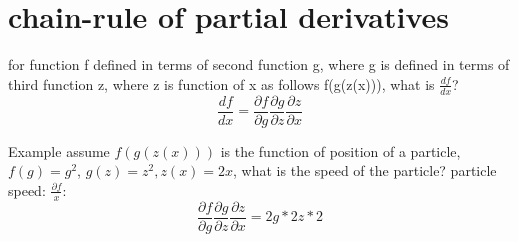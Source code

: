 \documentclass[4apaper,12pt]{book}
\begin{document}
  \section{chain-rule of partial derivatives}
  \begin{description}
  \item for function f defined in terms of second function g, where g is defined in terms of third function z, where z is function of x as follows f(g(z(x))), what is $\frac{df}{dx}$?
    \begin{equation} \frac{df}{dx} = \frac{\partial{f}}{\partial{g}}\frac{\partial{g}}{\partial{z}}\frac{\partial{z}}{\partial{x}} \end{equation}
  \item Example assume $f(g(z(x)))$ is the function of position of a particle, $f(g) = g^2$, $g(z)=z^2, z(x)=2x$, what is the speed of the particle? particle speed: $\frac{\partial{f}}{x}$:
    \begin{equation} \frac{\partial{f}}{\partial{g}}\frac{\partial{g}}{\partial{z}}\frac{\partial{z}}{\partial{x}} = 2g*2z*2 \end{equation}
  \end{description}
\end{document}
